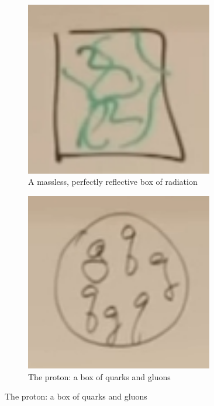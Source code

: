 \documentclass[]{article}
\begin{document}
\begin{appendices}
	\begin{figure}[H]
		\caption{How to get a mass}
		\begin{subfigure}[t]{0.45\textwidth}
			\caption{A massless, perfectly reflective box of radiation}\label{fig:2-a2-box-of-radiation}
			\includegraphics[width=0.9\textwidth]{2-a2-box-of-radiation}
		\end{subfigure}
		\begin{subfigure}[t]{0.45\textwidth}
			\caption{The proton: a box of quarks and gluons}\label{fig:2-a2-box-of-gluons}
			\includegraphics[width=0.9\textwidth]{2-a2-box-of-gluons}
		\end{subfigure}
	\end{figure}


\end{appendices}
\end{document}
